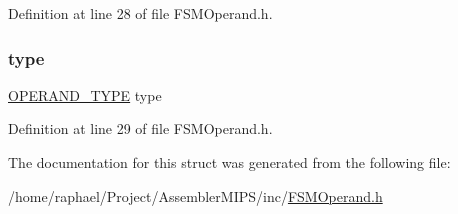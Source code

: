 Definition at line 28 of file F\+S\+M\+Operand.\+h.

\mbox{\label{struct_f_s_m___s_t_a_t_e___o_p_e_r_a_n_d_a0374dbe8bb9cccace9c5064f40c5b158}} 
\subsubsection{\texorpdfstring{type}{type}}
{\footnotesize\ttfamily \mbox{\hyperlink{_f_s_m_operand_8h_aa2d7050d955e23a8f1a28c1ccf21111f}{O\+P\+E\+R\+A\+N\+D\+\_\+\+T\+Y\+PE}} type}



Definition at line 29 of file F\+S\+M\+Operand.\+h.



The documentation for this struct was generated from the following file\+:\begin{DoxyCompactItemize}
\item 
/home/raphael/\+Project/\+Assembler\+M\+I\+P\+S/inc/\mbox{\hyperlink{_f_s_m_operand_8h}{F\+S\+M\+Operand.\+h}}\end{DoxyCompactItemize}
